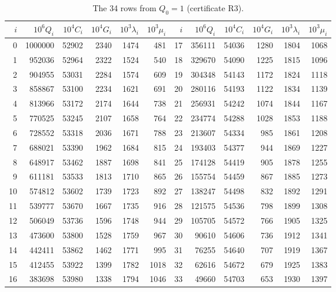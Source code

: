 \documentclass[11pt]{article}
\theoremstyle{definition}
\theoremstyle{remark}
\numberwithin{equation}{section}
\begin{document}
\begin{table}[h!]
\centering\small
\begin{tabular}{@{}rrrrrr@{\qquad}rrrrrr@{}}
\toprule
$i$ & $10^6Q_i$ & $10^4C_i$ & $10^4G_i$ & $10^3\lambda_i$ & $10^3\mu_i$ & $i$ & $10^6Q_i$ & $10^4C_i$ & $10^4G_i$ & $10^3\lambda_i$ & $10^3\mu_i$\\
\midrule
0 & 1000000 & 52902 & 2340 & 1474 & 481 & 17 & 356111 & 54036 & 1280 & 1804 & 1068\\
1 & 952036 & 52964 & 2322 & 1524 & 540 & 18 & 329670 & 54090 & 1225 & 1815 & 1096\\
2 & 904955 & 53031 & 2284 & 1574 & 609 & 19 & 304348 & 54143 & 1172 & 1824 & 1118\\
3 & 858867 & 53100 & 2234 & 1621 & 691 & 20 & 280116 & 54193 & 1122 & 1834 & 1139\\
4 & 813966 & 53172 & 2174 & 1644 & 738 & 21 & 256931 & 54242 & 1074 & 1844 & 1167\\
5 & 770525 & 53245 & 2107 & 1658 & 764 & 22 & 234774 & 54288 & 1028 & 1853 & 1188\\
6 & 728552 & 53318 & 2036 & 1671 & 788 & 23 & 213607 & 54334 & 985 & 1861 & 1208\\
7 & 688021 & 53390 & 1962 & 1684 & 815 & 24 & 193403 & 54377 & 944 & 1869 & 1227\\
8 & 648917 & 53462 & 1887 & 1698 & 841 & 25 & 174128 & 54419 & 905 & 1878 & 1255\\
9 & 611181 & 53533 & 1813 & 1710 & 865 & 26 & 155754 & 54459 & 867 & 1885 & 1273\\
10 & 574812 & 53602 & 1739 & 1723 & 892 & 27 & 138247 & 54498 & 832 & 1892 & 1291\\
11 & 539777 & 53670 & 1667 & 1735 & 916 & 28 & 121575 & 54536 & 798 & 1899 & 1308\\
12 & 506049 & 53736 & 1596 & 1748 & 944 & 29 & 105705 & 54572 & 766 & 1905 & 1325\\
13 & 473600 & 53800 & 1528 & 1759 & 967 & 30 & 90610 & 54606 & 736 & 1912 & 1341\\
14 & 442411 & 53862 & 1462 & 1771 & 995 & 31 & 76255 & 54640 & 707 & 1919 & 1367\\
15 & 412455 & 53922 & 1399 & 1782 & 1018 & 32 & 62616 & 54672 & 679 & 1925 & 1383\\
16 & 383698 & 53980 & 1338 & 1794 & 1046 & 33 & 49660 & 54703 & 653 & 1930 & 1397\\
\bottomrule
\end{tabular}
\caption{The 34 rows from $Q_0=1$ (certificate R3).}\label{tab:table}
\end{table}
\end{document}
